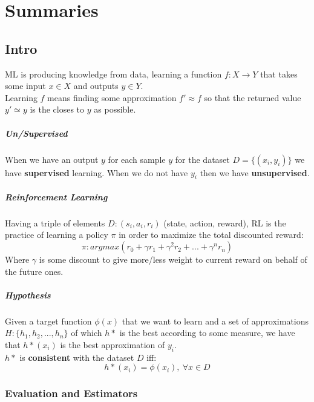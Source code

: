 
\newcommand{\braces}[1]{\lbrace{#1}\rbrace}

\chapter{Summaries}
\section{Intro}

ML is producing knowledge from data, learning a function $f:X\rightarrow Y$ that takes some input $x \in X$ and outputs $y \in Y$.\\
Learning $f$ means finding some approximation $f' \approx f$ so that the returned value $y' \simeq y$ is the closes to $y$ as possible.\\

\paragraph{Un/Supervised}  When we have an output $y$ for each sample $y$ for the dataset $D=\lbrace (x_i,y_i)\rbrace$ we have \textbf{supervised } learning. When we do not have $y_i$ then we have \textbf{unsupervised}.

\paragraph{Reinforcement Learning}
Having a triple of elements $D: (s_i,a_i,r_i)$ (state, action, reward), RL is the practice of learning a policy $\pi$ in order to maximize the total discounted reward:
\[\pi: argmax(r_0+ \gamma r_1+ \gamma^2 r_2+...+\gamma^n r_n)\]
Where $\gamma$ is some discount to give more/less weight to current reward on behalf of the future ones.

\paragraph{Hypothesis}
Given a target function $\phi(x)$ that we want to learn and a set of approximations $H:\lbrace h_1, h_2,...,h_n\rbrace$ of which $h*$ is the best according to some measure, we have that $h*(x_i)$ is the best approximation of $y_i$.\\
$h*$ is \textbf{consistent} with the dataset $D$ iff:
$$h*(x_i)= \phi(x_i),\ \forall x \in D$$

\subsection{Evaluation and Estimators}

